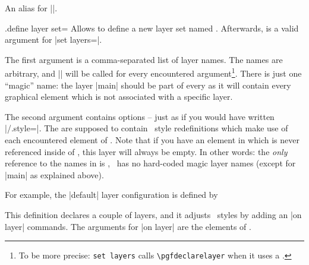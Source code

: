 {\begin{command}{}
\end{command}
\begin{command}{}
    An alias for ||.
\end{command}

\begin{handler}{{.define layer set}=}
	Allows to define a new layer set named . Afterwards,  is a valid argument for |set layers=|.

	The first argument  is a comma-separated list of layer names. The names are arbitrary, and |\pgfdeclarelayer| will be called for every encountered argument\footnote{To be more precise: \texttt{set layers} calls \texttt{\textbackslash pgfdeclarelayer} when it uses a .}. There is just one ``magic'' name: the layer |main| should be part of every  as it will contain every graphical element which is not associated with a specific layer.

	The second argument  contains options -- just as if you would have written |/.style=|. The  are supposed to contain \PGFPlots\ style redefinitions which make use of each encountered element of . Note that if you have an element in  which is never referenced inside of , this layer will always be empty. In other words: the \emph{only} reference to the names in  is , \PGFPlots\ has no hard-coded magic layer names (except for |main| as explained above).

	For example, the |default| layer configuration is defined by
\begin{codeexample}
\end{codeexample}
	\noindent This definition declares a couple of layers, and it adjusts \PGFPlots\ styles by adding an |on layer| commands. The arguments for |on layer| are the elements of .


\end{handler}}
